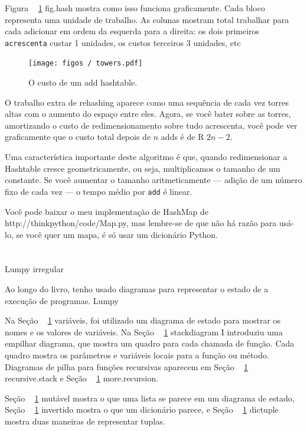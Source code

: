 \documentclass[10pt]{book}
\begin{document}
\begin{exercise}
\begin{v erbatim}
Figura ~ \ref {} fig.hash mostra como isso funciona graficamente. Cada
bloco representa uma unidade de trabalho. As colunas mostram total
trabalhar para cada adicionar em ordem da esquerda para a direita: os dois primeiros
{\tt acrescenta} custar 1 unidades, os custos terceiros 3 unidades, etc

\begin{figure}
\centerline {\texttt{[image: figos / towers.pdf]}}
\caption{O custo de um add hashtable. \label{fig.hash}}
\end{figure}

O trabalho extra de rehashing aparece como uma sequência de cada vez
torres altas com o aumento do espaço entre eles. Agora, se você bater
sobre as torres, amortizando o custo de redimensionamento sobre tudo
acrescenta, você pode ver graficamente que o custo total depois de $ n $
adds é de R $ 2n - 2 $.

Uma característica importante deste algoritmo é que, quando redimensionar a
Hashtable cresce geometricamente, ou seja, multiplicamos o tamanho de um
constante. Se você aumentar o tamanho
aritmeticamente --- adição de um número fixo de cada vez --- o tempo médio
por {\tt add} é linear.

Você pode baixar o meu implementação de HashMap de
\url{} http://thinkpython/code/Map.py, mas lembre-se de que não
há razão para usá-lo, se você quer um mapa, é só usar um dicionário Python.






\chapter{} Lumpy
\label{} irregular

Ao longo do livro, tenho usado diagramas para representar o estado de
a execução de programas.
\index{} Lumpy

Na Seção ~ \ref {} variáveis, foi utilizado um diagrama de estado para mostrar os nomes
e os valores de variáveis. Na Seção ~ \ref {} stackdiagram I introduziu uma
empilhar diagrama, que mostra um quadro para cada chamada de função. Cada
quadro mostra os parâmetros e variáveis ​​locais para a função ou
método. Diagramas de pilha para funções recursivas aparecem em
Seção ~ \ref {} recursive.stack e Seção ~ \ref {} more.recursion.
 
 

Seção ~ \ref {} mutável mostra o que uma lista se parece em um diagrama de estado,
Seção ~ \ref {} invertido mostra o que um dicionário parece, e
Seção ~ \ref {} dictuple mostra duas maneiras de representar tuplas.


\end{v erbatim}
\end{exercise}
\end{document}
